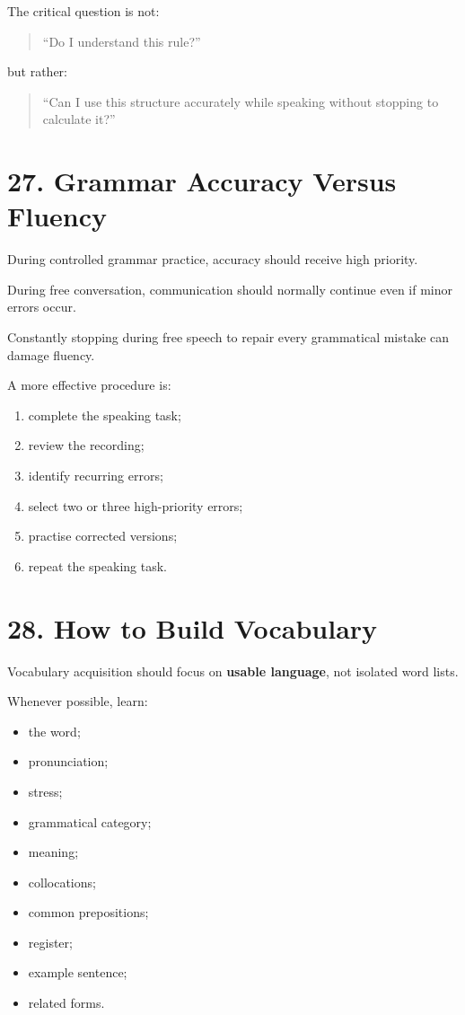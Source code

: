 The critical question is not:

\begin{quote}
``Do I understand this rule?''
\end{quote}

but rather:

\begin{quote}
``Can I use this structure accurately while speaking without stopping to calculate it?''
\end{quote}

\section*{27. Grammar Accuracy Versus Fluency}

During controlled grammar practice, accuracy should receive high priority.

During free conversation, communication should normally continue even if minor errors occur.

Constantly stopping during free speech to repair every grammatical mistake can damage fluency.

A more effective procedure is:

\begin{enumerate}
    \item complete the speaking task;
    \item review the recording;
    \item identify recurring errors;
    \item select two or three high-priority errors;
    \item practise corrected versions;
    \item repeat the speaking task.
\end{enumerate}

\section*{28. How to Build Vocabulary}

Vocabulary acquisition should focus on \textbf{usable language}, not isolated word lists.

Whenever possible, learn:

\begin{itemize}
    \item the word;
    \item pronunciation;
    \item stress;
    \item grammatical category;
    \item meaning;
    \item collocations;
    \item common prepositions;
    \item register;
    \item example sentence;
    \item related forms.
\end{itemize}

